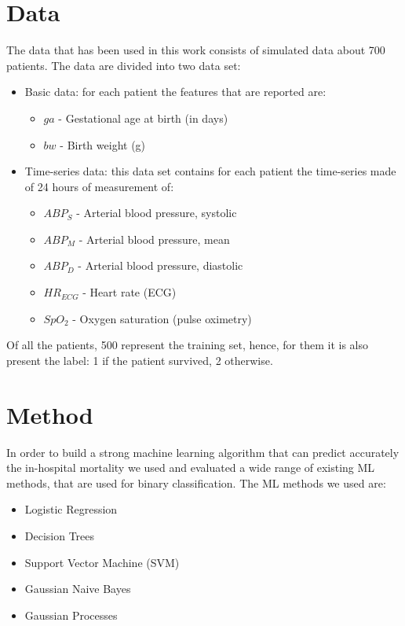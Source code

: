 \documentclass[a4paper,11pt]{article}
\begin{document}
\section{Data} %
The data that has been used in this work consists of simulated data about 700 patients. The data are divided into two data set:
\begin{itemize}
    \item Basic data: for each patient the features that are reported are:
    \begin{itemize}
        \item $ga$ - Gestational age at birth (in days)
        \item $bw$ - Birth weight (g)
    \end{itemize}
    \item Time-series data: this data set contains for each patient the time-series made of 24 hours of measurement of:
    \begin{itemize}
        \item $ABP_S$ - Arterial blood pressure, systolic
        \item $ABP_M$ - Arterial blood pressure, mean
        \item $ABP_D$ - Arterial blood pressure, diastolic
        \item $HR_{ECG}$ - Heart rate (ECG)
        \item $SpO_2$ - Oxygen saturation (pulse oximetry)
    \end{itemize}
\end{itemize}
Of all the patients, 500 represent the training set, hence, for them it is also present the label: 1 if the patient survived, 2 otherwise.

\section{Method}

In order to build a strong machine learning algorithm that can predict accurately the in-hospital mortality we used and evaluated a wide range of existing ML methods, that are used for binary classification. The ML methods we used are:

\begin{itemize}
    \item Logistic Regression
    \item Decision Trees
    \item Support Vector Machine (SVM)
    \item Gaussian Naive Bayes 
    \item Gaussian Processes
\end{itemize}
\end{document}
